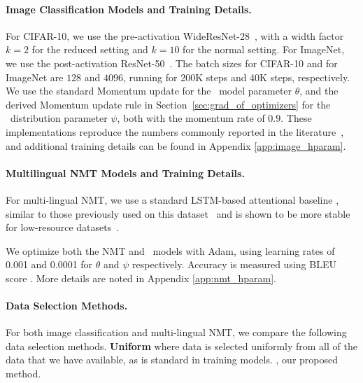 \paragraph{Image Classification Models and Training Details.}
For CIFAR-10, we use the pre-activation WideResNet-28~\citep{wide_res_net}, with a width factor $k=2$ for the reduced setting and $k=10$ for the normal setting. For ImageNet, we use the post-activation ResNet-50~\citep{res_net}. 
The batch sizes for CIFAR-10 and for ImageNet are $128$ and $4096$, running for 200K steps and 40K steps, respectively. We use the standard Momentum update for the \dds~model parameter $\theta$, and the derived Momentum update rule in Section~\ref{sec:grad_of_optimizers} for the \dds~distribution parameter $\psi$, both with the momentum rate of $0.9$.
These implementations reproduce the numbers commonly reported in the literature~\citep{wide_res_net,res_net,resnext}, and additional training details can be found in Appendix \ref{app:image_hparam}.


\paragraph{Multilingual NMT Models and Training Details.}
For multi-lingual NMT, we use a standard LSTM-based attentional baseline \citep{attention}, similar to those previously used on this dataset~\citep{rapid_adapt_nmt,sde} and is shown to be more stable for low-resource datasets~\citep{lownmt19}. 

We optimize both the NMT and \dds~models with Adam, using learning rates of 0.001 and 0.0001 for $\theta$ and $\psi$ respectively.
Accuracy is measured using BLEU score \citep{bleu}.
More details are noted in Appendix \ref{app:nmt_hparam}.

\paragraph{Data Selection Methods.}
For both image classification and multi-lingual NMT, we compare the following data selection methods.
\textbf{Uniform} where data is selected uniformly from all of the data that we have available, as is standard in training models.
\textbf{\dds}, our proposed method.

